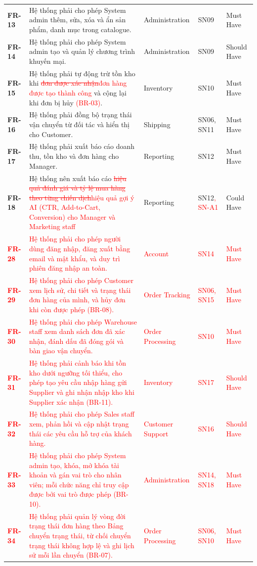 \documentclass[12pt,a4paper,oneside]{report}
\newif\ifmark \marktrue
\newcommand{\chg}[1]{\ifmark\textcolor{red}{#1}\else #1\fi}
\newcommand{\del}[1]{\ifmark\textcolor{red}{\sout{#1}}\fi}
\begin{document}
\begin{longtable}{p{1.6cm}p{7.4cm}p{2.9cm}p{1.9cm}p{2.2cm}}
\textbf{FR-13} & Hệ thống phải cho phép System admin thêm, sửa, xóa và ẩn sản phẩm, danh mục trong catalogue. & Administration & SN09 & Must Have \\
\textbf{FR-14} & Hệ thống phải cho phép System admin tạo và quản lý chương trình khuyến mại. & Administration & SN09 & Should Have \\
\textbf{FR-15} & Hệ thống phải tự động trừ tồn kho khi \del{đơn được xác nhận}\chg{đơn hàng được tạo thành công} và cộng lại khi đơn bị hủy\chg{ (BR-03)}. & Inventory & SN10 & Must Have \\
\textbf{FR-16} & Hệ thống phải đồng bộ trạng thái vận chuyển từ đối tác và hiển thị cho Customer. & Shipping & SN06, SN11 & Must Have \\
\textbf{FR-17} & Hệ thống phải xuất báo cáo doanh thu, tồn kho và đơn hàng cho Manager. & Reporting & SN12 & Must Have \\
\textbf{FR-18} & Hệ thống nên xuất báo cáo \del{hiệu quả đánh giá và tỷ lệ mua hàng theo từng chiến dịch}\chg{hiệu quả gợi ý AI (CTR, Add-to-Cart, Conversion) cho Manager và Marketing staff} & Reporting & SN12\chg{, SN-A1} & Could Have \\
\chg{\textbf{FR-28}} & \chg{Hệ thống phải cho phép người dùng đăng nhập, đăng xuất bằng email và mật khẩu, và duy trì phiên đăng nhập an toàn.} & \chg{Account} & \chg{SN14} & \chg{Must Have} \\
\chg{\textbf{FR-29}} & \chg{Hệ thống phải cho phép Customer xem lịch sử, chi tiết và trạng thái đơn hàng của mình, và hủy đơn khi còn được phép (BR-08).} & \chg{Order Tracking} & \chg{SN06, SN15} & \chg{Must Have} \\
\chg{\textbf{FR-30}} & \chg{Hệ thống phải cho phép Warehouse staff xem danh sách đơn đã xác nhận, đánh dấu đã đóng gói và bàn giao vận chuyển.} & \chg{Order Processing} & \chg{SN10} & \chg{Must Have} \\
\chg{\textbf{FR-31}} & \chg{Hệ thống phải cảnh báo khi tồn kho dưới ngưỡng tối thiểu, cho phép tạo yêu cầu nhập hàng gửi Supplier và ghi nhận nhập kho khi Supplier xác nhận (BR-11).} & \chg{Inventory} & \chg{SN17} & \chg{Should Have} \\
\chg{\textbf{FR-32}} & \chg{Hệ thống phải cho phép Sales staff xem, phản hồi và cập nhật trạng thái các yêu cầu hỗ trợ của khách hàng.} & \chg{Customer Support} & \chg{SN16} & \chg{Should Have} \\
\chg{\textbf{FR-33}} & \chg{Hệ thống phải cho phép System admin tạo, khóa, mở khóa tài khoản và gán vai trò cho nhân viên; mỗi chức năng chỉ truy cập được bởi vai trò được phép (BR-10).} & \chg{Administration} & \chg{SN14, SN18} & \chg{Must Have} \\
\chg{\textbf{FR-34}} & \chg{Hệ thống phải quản lý vòng đời trạng thái đơn hàng theo Bảng chuyển trạng thái, từ chối chuyển trạng thái không hợp lệ và ghi lịch sử mỗi lần chuyển (BR-07).} & \chg{Order Processing} & \chg{SN06, SN10} & \chg{Must Have} \\
\end{longtable}
\end{document}
